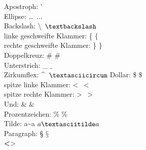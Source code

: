 \documentclass{scrartcl}
\begin{document}
  Apostroph: ' \\
  Ellipse: \dots\ $\ldots$\\
  Backslash: \textbackslash\ $\textbackslash$\\
  linke geschweifte Klammer: \{ $\{$\\
  rechte geschweifte Klammer: \} $\}$\\
  Doppelkreuz: \# $\#$\\

  Unterstrich: \_ $\_$\\
  Zirkumflex: \textasciicircum\ $\textasciicircum$
  Dollar: \$ $\$$\\

  spitze linke Klammer: \textless\ $<$\\
  spitze rechte Klammer: \textgreater\ $>$\\
  
  
  Und: \& $\&$\\
  
  
  Prozentzeichen: \% $\%$\\
  Tilde: a\textasciitilde a $a\textasciitilde a$\\
  Paragraph: § $§$\\

  \textbf<>
\end{document}
